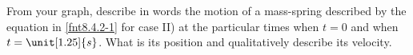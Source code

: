 \label{8.4.2-2}

From your graph, describe in words the motion of a mass-spring described by the equation in \ref{fnt8.4.2-1} for case II) at the particular times when $t = 0$ and when $t = \unit[1.25]{s}$.  What is its position and qualitatively describe its velocity.